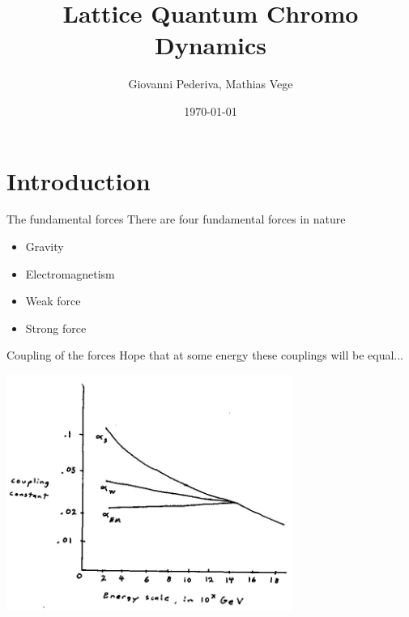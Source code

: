 \documentclass[10pt]{beamer}
\title{Lattice Quantum Chromo Dynamics}
\date{\today}
\author{Giovanni Pederiva, Mathias Vege}
\institute{University of Oslo}
\begin{document}
\maketitle


\section{Introduction}

\begin{frame}{The fundamental forces}
	There are four fundamental forces in nature
	\begin{itemize}
		\item Gravity
		\item Electromagnetism
		\item Weak force
		\item Strong force
	\end{itemize}
\end{frame}

\begin{frame}{Coupling of the forces}
	Hope that at some energy these couplings will be equal...
	\begin{center}
	\includegraphics[width=0.7\textwidth]{figures/couplings.jpg}
	\end{center}
\end{frame}
\end{document}
